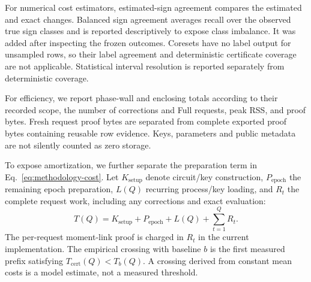 For numerical cost estimators, estimated-sign agreement compares the
estimated and exact changes. Balanced sign agreement averages recall over
the observed true sign classes and is reported descriptively to expose
class imbalance. It was added after inspecting the frozen outcomes.
Coresets have no label output for unsampled rows, so their label agreement
and deterministic certificate coverage are not applicable. Statistical
interval resolution is reported separately from deterministic coverage.

For efficiency, we report phase-wall and enclosing totals according to their
recorded scope, the number of corrections and Full requests, peak RSS, and
proof bytes. Fresh request proof bytes are separated from complete exported
proof bytes containing reusable row evidence. Keys, parameters and public
metadata are not silently counted as zero storage.

To expose amortization, we further separate the preparation term in
Eq.~\eqref{eq:methodology-cost}. Let $K_{\mathrm{setup}}$ denote circuit/key
construction, $P_{\mathrm{epoch}}$ the remaining epoch preparation,
$L(Q)$ recurring process/key loading, and $R_t$
the complete request work, including any corrections and exact evaluation:
\begin{equation}
 T(Q)=K_{\mathrm{setup}}+P_{\mathrm{epoch}}+L(Q)+\sum_{t=1}^{Q}R_t.
 \label{eq:ccd-accounting}
\end{equation}
The per-request moment-link proof is charged in $R_t$ in the current
implementation. The empirical crossing with baseline $b$ is the first
measured prefix satisfying $T_{\mathrm{cert}}(Q)<T_b(Q)$. A crossing derived
from constant mean costs is a model estimate, not a measured threshold.


